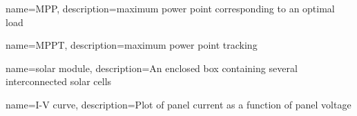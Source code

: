 {
  name=MPP,
  description={maximum power point corresponding to an optimal load}
}

{
  name=MPPT,
  description={maximum power point tracking}
}

{
  name=solar module,
  description={An enclosed box containing several interconnected solar cells}
}

{
  name=I-V curve,
  description={Plot of panel current as a function of panel voltage}
}


\makeglossaries
\glsaddall

